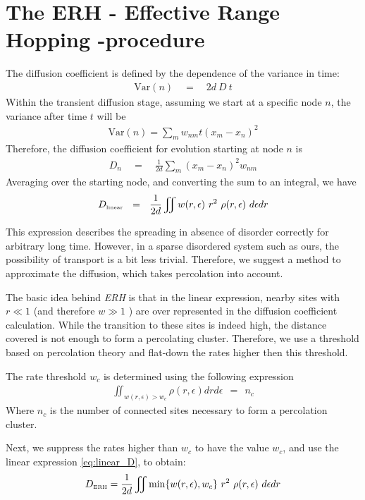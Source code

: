 \section{The ERH - Effective Range Hopping -procedure}

The diffusion coefficient is defined by the dependence
of the variance in time:
%
\begin{align}
\textrm{Var}(n) \quad =\quad 2d\ D\ t
\end{align}
%
Within the transient diffusion stage,
assuming we start at a specific node $n$, the variance after time
$t$ will be
%
\begin{align}
\textrm{Var}(n) = \sum_m w_{nm} t (x_m-x_n)^2
\end{align}
Therefore, the diffusion coefficient for evolution 
starting at node $n$ is
%
\begin{align}
D_n \quad=\quad \frac{1}{2d}\sum_m (x_m-x_n)^2 w_{nm}
\end{align}
%
Averaging over the starting node, and converting the sum to an integral,
we have
%
\begin{align}\label{eq:linear_D}
D_{\tbox{linear}}  \ \ = \ \ \frac{1}{2d}\iint w(r,\epsilon) \ r^2  \ \rho(r,\epsilon) \ d\epsilon dr 
\end{align}
%

This expression describes the spreading in absence of disorder correctly
for arbitrary long time. However, in a sparse disordered system such as ours,
the possibility of transport is a bit less trivial. Therefore, we suggest
a method to approximate the diffusion, which takes percolation into account.


The basic idea behind \emph{ERH} is that in the linear
expression, nearby sites 
with $r\ll 1$ (and therefore $w \gg 1$ ) are over represented in
the diffusion coefficient calculation. While the transition to
these sites is indeed high, the distance covered is not enough
to form a percolating cluster. Therefore, we use a threshold based
on percolation theory and flat-down the rates higher then this threshold.

The rate threshold $w_c$ is determined using the following expression
%
\begin{align}\label{eq:threshold}
\iint_{w(r,\epsilon)>w_c} \rho(r,\epsilon)drd\epsilon \ \ = \ \ n_c
\end{align}
%
Where $n_c$ is the number of connected sites necessary to form a percolation
cluster.


Next, we suppress the rates higher than $w_c$ to have the value $w_c$,
and use the linear expression \ref{eq:linear_D}, to obtain:
%
\begin{align}\label{eq:ERH_D}
D_{\tbox{ERH}} = \frac{1}{2d}\iint \min\{w(r,\epsilon),w_c\} \ r^2  \ \rho(r,\epsilon) \ d\epsilon dr
\end{align}
%


